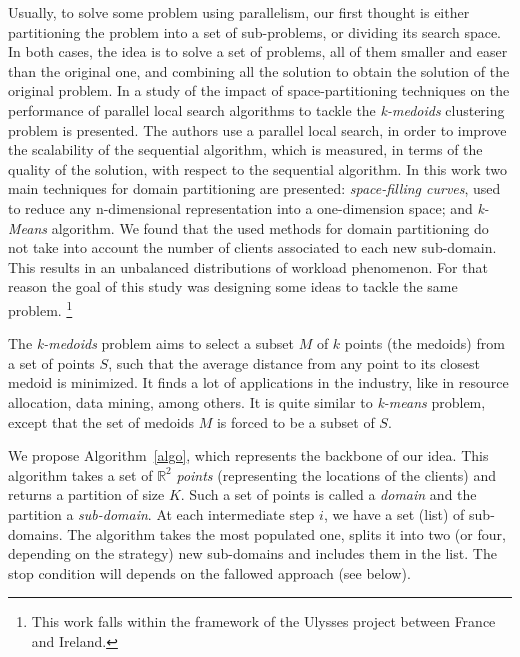 
Usually, to solve some problem using parallelism, our first thought is either partitioning the problem into a set of sub-problems, or dividing its search space. In both cases, the idea is to solve a set of problems, all of them smaller and easer than the original one, and combining all the solution to obtain the solution of the original problem. In \cite{Arbelaez2012} a study of the impact of space-partitioning techniques on the performance of parallel local search algorithms to tackle the \textit{k-medoids} clustering problem is presented. The authors use a parallel local search, in order to improve the scalability of the sequential algorithm, which is measured, in terms of the quality of the solution, with respect to the sequential algorithm. In this work two main techniques for domain partitioning are presented: {\it space-filling curves}, used to reduce any n-dimensional representation into a one-dimension space; and {\it k-Means} algorithm. We found that the used methods for domain partitioning do not take into account the number of clients associated to each new sub-domain. This results in an unbalanced distributions of workload phenomenon. For that reason the goal of this study was designing some ideas to tackle the same problem. \footnote{This work falls within the framework of the Ulysses project between France and Ireland.}

The \textit{k-medoids} problem aims to select a subset $M$ of $k$ points (the medoids) from a set of points $S$, such that the average distance from any point to its closest medoid is minimized. It finds a lot of applications in the industry, like in resource allocation, data mining, among others. It is quite similar to \textit{k-means} problem, except that the set of medoids $M$ is forced to be a subset of $S$.

We propose Algorithm~\ref{algo}, which represents the backbone of our idea. This algorithm takes a set of $\mathbb{R}^2$ {\it points} (representing the locations of the clients) and returns a partition of size $K$. Such a set of points is called a {\it domain} and the partition a {\it sub-domain}. At each intermediate step $i$, we have a set (list) of sub-domains. The algorithm takes the most populated one, splits it into two (or four, depending on the strategy) new sub-domains and includes them in the list. The stop condition will depends on the fallowed approach (see below).

